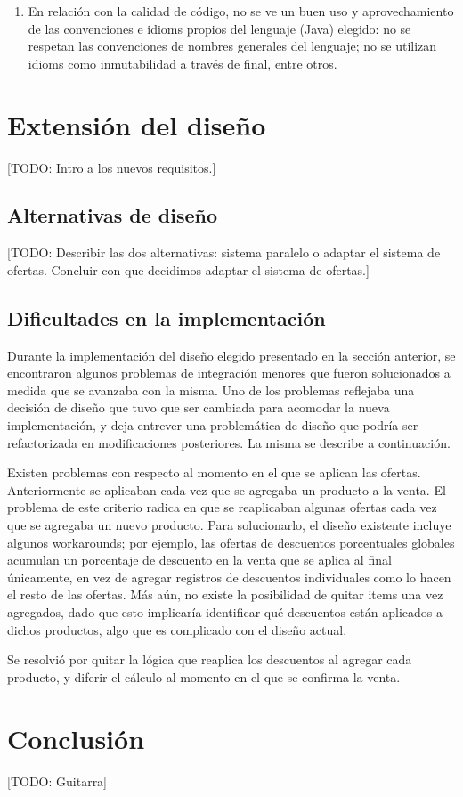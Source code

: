 \documentclass[a4paper,11pt]{article}
\begin{document}
\begin{enumerate}
  \item En relación con la calidad de código, no se ve un buen uso y
    aprovechamiento de las convenciones e idioms propios del lenguaje (Java)
    elegido: no se respetan las convenciones de nombres generales del lenguaje;
    no se utilizan idioms como inmutabilidad a través de final, entre otros.

\end{enumerate}

\section{Extensión del diseño}

[TODO: Intro a los nuevos requisitos.]

\subsection{Alternativas de diseño}

[TODO: Describir las dos alternativas: sistema paralelo o adaptar el sistema de
ofertas. Concluir con que decidimos adaptar el sistema de ofertas.]

\subsection{Dificultades en la implementación}

Durante la implementación del diseño elegido presentado en la sección anterior,
se encontraron algunos problemas de integración menores que fueron solucionados
a medida que se avanzaba con la misma. Uno de los problemas reflejaba una
decisión de diseño que tuvo que ser cambiada para acomodar la nueva
implementación, y deja entrever una problemática de diseño que podría ser
refactorizada en modificaciones posteriores. La misma se describe a
continuación.

Existen problemas con respecto al momento en el que se aplican las ofertas.
Anteriormente se aplicaban cada vez que se agregaba un producto a la venta.  El
problema de este criterio radica en que se reaplicaban algunas ofertas cada vez
que se agregaba un nuevo producto. Para solucionarlo, el diseño existente
incluye algunos workarounds; por ejemplo, las ofertas de descuentos
porcentuales globales acumulan un porcentaje de descuento en la venta que se
aplica al final únicamente, en vez de agregar registros de descuentos
individuales como lo hacen el resto de las ofertas. Más aún, no existe la
posibilidad de quitar items una vez agregados, dado que esto implicaría
identificar qué descuentos están aplicados a dichos productos, algo que es
complicado con el diseño actual.

Se resolvió por quitar la lógica que reaplica los descuentos al agregar cada
producto, y diferir el cálculo al momento en el que se confirma la venta.

\section{Conclusión}

[TODO: Guitarra]
\end{document}
